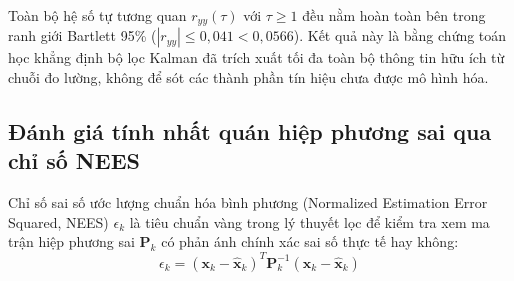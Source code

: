 \begin{table}[H]
\centering
\caption{Hệ số tự tương quan phần dư đổi mới $r_{yy}(\tau)$ qua 10 bước trễ ($N=1200$)}
\label{tab:innovation-autocorrelation}
\end{table}

Toàn bộ hệ số tự tương quan $r_{yy}(\tau)$ với $\tau \ge 1$ đều nằm hoàn toàn bên trong ranh giới Bartlett 95\% ($|r_{yy}| \le 0{,}041 < 0{,}0566$). Kết quả này là bằng chứng toán học khẳng định bộ lọc Kalman đã trích xuất tối đa toàn bộ thông tin hữu ích từ chuỗi đo lường, không để sót các thành phần tín hiệu chưa được mô hình hóa.

\subsection{Đánh giá tính nhất quán hiệp phương sai qua chỉ số NEES}

\hspace{0.5cm} Chỉ số sai số ước lượng chuẩn hóa bình phương (Normalized Estimation Error Squared, NEES) $\epsilon_k$ là tiêu chuẩn vàng trong lý thuyết lọc để kiểm tra xem ma trận hiệp phương sai $\mathbf{P}_k$ có phản ánh chính xác sai số thực tế hay không:
\begin{equation}
\epsilon_k = (\mathbf{x}_k - \hat{\mathbf{x}}_k)^T \mathbf{P}_k^{-1} (\mathbf{x}_k - \hat{\mathbf{x}}_k)
\label{eq:nees-definition}
\end{equation}

